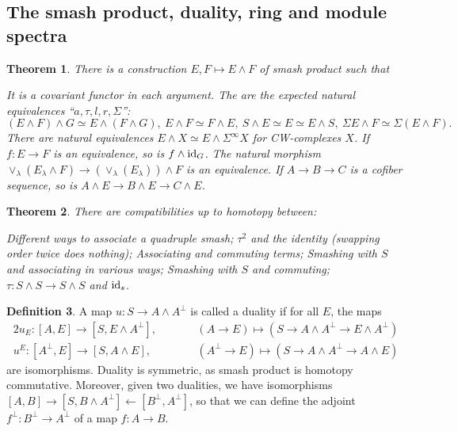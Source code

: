 \documentclass[11pt]{article}
\theoremstyle{plain}
\newtheorem{thm}{Theorem}[subsection]
\theoremstyle{definition}
\newtheorem{defn}[thm]{Definition}
\begin{document}
\subsection{The smash product, duality, ring and module spectra}
\begin{thm}
There is a construction $E,F\mapsto E\wedge F$ of smash product such that
\begin{itemise}
\itm[(i)]It is a covariant functor in each argument.
\itm[(ii)]The are the expected natural equivalences ``$a,\tau,l,r,\Sigma$'':
\[(E\wedge F)\wedge G\simeq E\wedge(F\wedge G),\ E\wedge F\simeq F\wedge E,\
S\wedge E\simeq E\simeq E\wedge S,\ \Sigma E\wedge F\simeq \Sigma(E\wedge F).\]
\itm[(iii)]There are natural equivalences $E\wedge X\simeq E\wedge \Sigma^\infty
X$ for CW-complexes $X$.
\itm[(iv)]If $f:E\to F$ is an equivalence, so is $f\wedge \textup{id}_G$.
\itm[(v)]The natural morphism $\vee_\lambda(E_\lambda\wedge
F)\to(\vee_\lambda(E_\lambda))\wedge F$ is an equivalence.
\itm[(vi)]If $A\to B\to C$ is a cofiber sequence, so is $A\wedge E\to B\wedge
E\to C\wedge E$.
\end{itemise}
\end{thm}
\begin{thm}
There are compatibilities up to homotopy between:
\begin{itemise}
\itm[(i)] Different ways to associate a quadruple smash;
\itm[(ii)] $\tau^2$ and the identity (swapping order twice does nothing);
\itm[(iii)] Associating and commuting terms;
\itm[(iv)] Smashing with $S$ and associating in various ways;
\itm[(vii)] Smashing with $S$ and commuting;
\itm[(viii)] $\tau:S\wedge S\to S\wedge S$ and $\textup{id}_s$.
\end{itemise}
\end{thm}
\begin{defn}
A map $u:S\to A\wedge A^\perp$ is called a duality if for all $E$, the maps
\begin{alignat*}{2}
u_E:[A,E]\to[S,E\wedge A^\perp],&\qquad &
(A\to E)\mapsto (S\to A\wedge A^\perp\to E\wedge A^\perp)\\
u^E:[A^\perp,E]\to[S,A\wedge E],&\qquad &
(A^\perp\to E)\mapsto (S\to A\wedge A^\perp\to A\wedge E)
\end{alignat*}
are isomorphisms. Duality is symmetric, as smash product is homotopy
commutative. Moreover, given two dualities, we have isomorphisms
$[A,B]\longrightarrow[S,B\wedge A^\perp]\longleftarrow[B^\perp,A^\perp]$, so
that we can define the adjoint $f^\perp:B^\perp\to A^\perp$ of a map $f:A\to B$.
\end{defn}
\end{document}
